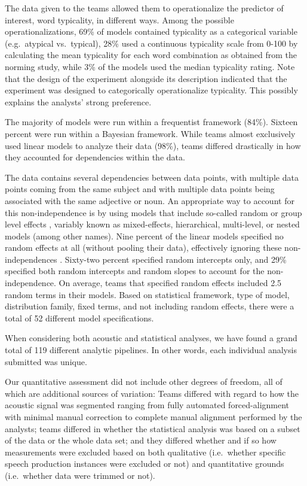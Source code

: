 \documentclass[Review,times,sageh]{sagej}
\begin{document}
The data given to the teams allowed them to operationalize the predictor of interest, word typicality, in different ways.
Among the possible operationalizations, 69\% of models contained typicality as a categorical variable (e.g.~atypical vs.~typical), 28\% used a continuous typicality scale from 0-100 by calculating the mean typicality for each word combination as obtained from the norming study, while 3\% of the models used the median typicality rating.
Note that the design of the experiment alongside its description indicated that the experiment was designed to categorically operationalize typicality. This possibly explains the analysts' strong preference.

The majority of models were run within a frequentist framework (84\%).
Sixteen percent were run within a Bayesian framework.
While teams almost exclusively used linear models to analyze their data (98\%), teams differed drastically in how they accounted for dependencies within the data.

The data contains several dependencies between data points, with multiple data points coming from the same subject and with multiple data points being associated with the same adjective or noun.
An appropriate way to account for this non-independence is by using models that include so-called random or group level effects \citep[e.g.,][]{gelman2006data, schielzeth2009conclusions}, variably known as mixed-effects, hierarchical, multi-level, or nested models (among other names).
Nine percent of the linear models specified no random effects at all (without pooling their data), effectively ignoring these non-independences \citep{hurlbert1984pseudoreplication}.
Sixty-two percent specified random intercepts only, and 29\% specified both random intercepts and random slopes to account for the non-independence.
On average, teams that specified random effects included 2.5 random terms in their models.
Based on statistical framework, type of model, distribution family, fixed terms, and not including random effects, there were a total of 52 different model specifications.

When considering both acoustic and statistical analyses, we have found a grand total of 119 different analytic pipelines.
In other words, each individual analysis submitted was unique.

Our quantitative assessment did not include other degrees of freedom, all of which are additional sources of variation:
Teams differed with regard to how the acoustic signal was segmented ranging from fully automated forced-alignment with minimal manual correction to complete manual alignment performed by the analysts; teams differed in whether the statistical analysis was based on a subset of the data or the whole data set; and they differed whether and if so how measurements were excluded based on both qualitative (i.e.~whether specific speech production instances were excluded or not) and quantitative grounds (i.e.~whether data were trimmed or not).
\end{document}
